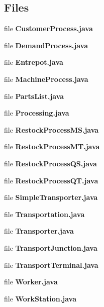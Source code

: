 \subsection*{Files}
\begin{DoxyCompactItemize}
\item 
file {\bfseries Customer\-Process.\-java}
\item 
file {\bfseries Demand\-Process.\-java}
\item 
file {\bfseries Entrepot.\-java}
\item 
file {\bfseries Machine\-Process.\-java}
\item 
file {\bfseries Parts\-List.\-java}
\item 
file {\bfseries Processing.\-java}
\item 
file {\bfseries Restock\-Process\-M\-S.\-java}
\item 
file {\bfseries Restock\-Process\-M\-T.\-java}
\item 
file {\bfseries Restock\-Process\-Q\-S.\-java}
\item 
file {\bfseries Restock\-Process\-Q\-T.\-java}
\item 
file {\bfseries Simple\-Transporter.\-java}
\item 
file {\bfseries Transportation.\-java}
\item 
file {\bfseries Transporter.\-java}
\item 
file {\bfseries Transport\-Junction.\-java}
\item 
file {\bfseries Transport\-Terminal.\-java}
\item 
file {\bfseries Worker.\-java}
\item 
file {\bfseries Work\-Station.\-java}
\end{DoxyCompactItemize}
